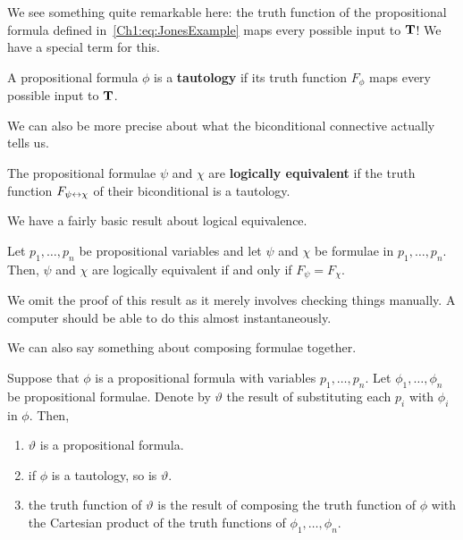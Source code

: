 \begin{boxexample}
    \sorry %
\end{boxexample}

We see something quite remarkable here: the truth function of the propositional formula defined in~\eqref{Ch1:eq:JonesExample} maps every possible input to $\mathbf{T}$! We have a special term for this.

\begin{boxdefinition}[Tautology]
    A propositional formula $\phi$ is a \textbf{tautology} if its truth function $F_{\phi}$ maps every possible input to $\mathbf{T}$.
\end{boxdefinition}

We can also be more precise about what the biconditional connective actually tells us.

\begin{boxdefinition}\label{Ch1:Def:LogicalEquivalence}
    The propositional formulae $\psi$ and $\chi$ are \textbf{logically equivalent} if the truth function $F_{\psi \leftrightarrow \chi}$ of their biconditional is a tautology.
\end{boxdefinition}

We have a fairly basic result about logical equivalence.

\begin{boxlemma}
    Let $p_1, \ldots, p_n$ be propositional variables and let $\psi$ and $\chi$ be formulae in $p_1, \ldots, p_n$. Then, $\psi$ and $\chi$ are logically equivalent if and only if $F_{\psi} = F_{\chi}$.
\end{boxlemma}

We omit the proof of this result as it merely involves checking things manually. A computer should be able to do this almost instantaneously.

We can also say something about composing formulae together.

\begin{boxlemma}
    Suppose that $\phi$ is a propositional formula with variables $p_1, \ldots, p_n$. Let $\phi_1, \ldots, \phi_n$ be propositional formulae. Denote by $\vartheta$ the result of substituting each $p_i$ with $\phi_i$ in $\phi$. Then,
    \begin{enumerate}[label = \normalfont (\roman*), noitemsep]
        \item $\vartheta$ is a propositional formula.
        \item if $\phi$ is a tautology, so is $\vartheta$.
        \item the truth function of $\vartheta$ is the result of composing the truth function of $\phi$ with the Cartesian product of the truth functions of $\phi_1, \ldots, \phi_n$.
    \end{enumerate}
\end{boxlemma}

